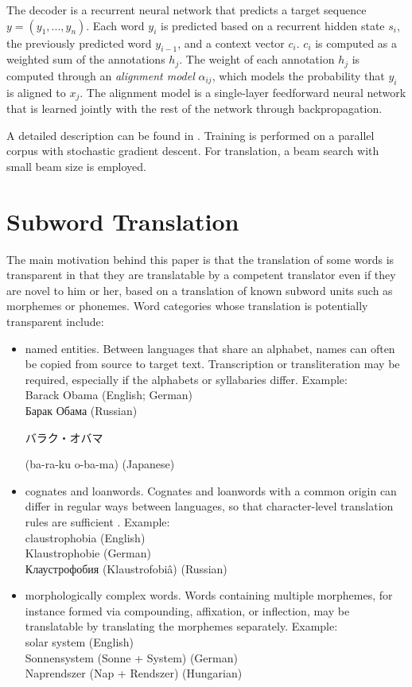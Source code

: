 \documentclass[11pt]{article}
\begin{document}
The decoder is a recurrent neural network that predicts a target sequence $y=(y_1,...,y_n)$.
Each word $y_i$ is predicted based on a recurrent hidden state $s_i$, the previously predicted word $y_{i-1}$, and a context vector $c_i$.
$c_i$ is computed as a weighted sum of the annotations $h_j$.
The weight of each annotation $h_j$ is computed through an \emph{alignment model} $\alpha_{ij}$, which models the probability that $y_i$ is aligned to $x_j$.
The alignment model is a single-layer feedforward neural network that is learned jointly with the rest of the network through backpropagation.

A detailed description can be found in \cite{DBLP:journals/corr/BahdanauCB14}.
Training is performed on a parallel corpus with stochastic gradient descent.
For translation, a beam search with small beam size is employed.

\section{Subword Translation}

The main motivation behind this paper is that the translation of some words is transparent in that they are translatable by a competent translator even if they are novel to him or her, based on a translation of known subword units such as morphemes or phonemes.
Word categories whose translation is potentially transparent include:

\begin{itemize}
\setlength{\itemsep}{0pt}
\item named entities. Between languages that share an alphabet, names can often be copied from source to target text.
Transcription or transliteration may be required, especially if the alphabets or syllabaries differ. Example:\\
Barack Obama (English; German)\\
\foreignlanguage{russian}{Барак Обама} (Russian)\\
\begin{CJK*}{UTF8}{goth}
\small
\CJKnospace
\ignorespaces
バラク・オバマ
\end{CJK*}
(ba-ra-ku o-ba-ma) (Japanese)
\item cognates and loanwords. Cognates and loanwords with a common origin can differ in regular ways between languages, so that character-level translation rules are sufficient \cite{tiedemann:2012:EACL2012}. Example:\\
claustrophobia (English)\\
Klaustrophobie (German)\\
\foreignlanguage{russian}{Клаустрофобия} (Klaustrofobiâ) (Russian)
\item morphologically complex words. Words containing multiple morphemes, for instance formed via compounding, affixation, or inflection, may be translatable by translating the morphemes separately. Example:\\
solar system (English)\\
Sonnensystem (Sonne + System) (German)\\
Naprendszer (Nap + Rendszer) (Hungarian)
\end{itemize}
\end{document}
